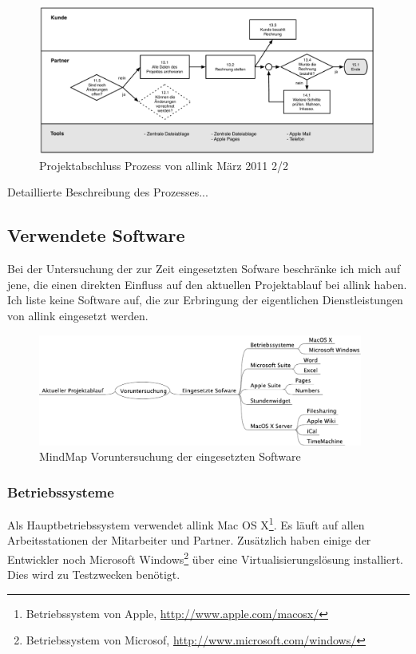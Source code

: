 \begin{figure}[htbp]
\begin{center}
\includegraphics[width=0.99\textwidth,angle=0]{./bilder/03_ist_prozesse_abschluss_02.pdf}
\caption{Projektabschluss Prozess von allink März 2011 2/2}
\label{pic:03_ist_prozesse_abschluss_02}
\end{center}
\end{figure}

Detaillierte Beschreibung des Prozesses...

\subsection{Verwendete Software}
Bei der Untersuchung der zur Zeit eingesetzten Sofware beschränke ich mich auf jene,
die einen direkten Einfluss auf den aktuellen Projektablauf bei allink haben.
Ich liste keine Software auf, die zur Erbringung der eigentlichen Dienstleistungen
von allink eingesetzt werden.

\begin{figure}[htbp]
\begin{center}
\includegraphics[width=0.95\textwidth,angle=0]{./mindmaps/voruntersuchung_software.pdf}
\caption{MindMap Voruntersuchung der eingesetzten Software}
\label{pic:voruntersuchung_software}
\end{center}
\end{figure}

\subsubsection{Betriebssysteme}
Als Hauptbetriebssystem verwendet allink Mac OS X\footnote{Betriebssystem von Apple, \url{http://www.apple.com/macosx/}}.
Es läuft auf allen Arbeitsstationen der Mitarbeiter und Partner. Zusätzlich haben einige der
Entwickler noch Microsoft Windows\footnote{Betriebssystem von Microsof, \url{http://www.microsoft.com/windows/}}
über eine Virtualisierungslösung installiert. Dies wird zu Testzwecken benötigt.

